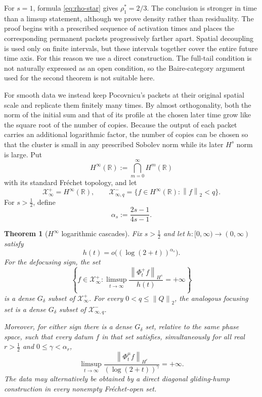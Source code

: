 \documentclass[10pt,a4paper]{amsart}
\numberwithin{equation}{section}
\newtheorem{theorem}{Theorem}[section]
\newcommand{\R}{\mathbb R}
\newcommand{\X}{\mathcal X}
\newcommand{\half}{\frac12}
\newcommand{\norm}[1]{\left\lVert #1\right\rVert}
\newcommand{\flow}[1]{\Phi^{#1}}
\begin{document}
For $s=1$, formula \eqref{eq:rho-star} gives $\rho_1^*=2/3$.  The conclusion is
stronger in time than a limsup statement, although we prove density rather
than residuality.  The proof begins with a prescribed sequence of activation
times and places the corresponding permanent packets progressively farther
apart.  Spatial decoupling is used only on finite intervals, but these
intervals together cover the entire future time axis.  For this reason we use
a direct construction.  The full-tail condition is not naturally expressed
as an open condition, so the Baire-category argument used for the second
theorem is not suitable here.

For smooth data we instead keep Pocovnicu's packets at their original spatial
scale and replicate them finitely many times.  By almost orthogonality, both
the norm of the initial sum and that of its profile at the chosen later time
grow like the square root of the number of copies.  Because the output of each
packet carries an additional logarithmic factor, the number of copies can be
chosen so that the cluster is small in any prescribed Sobolev norm while its
later $H^s$ norm is large.  Put
\begin{equation}\label{eq:hinfty}
 H^\infty(\R):=\bigcap_{m=0}^\infty H^m(\R)
\end{equation}
with its standard Fr\'echet topology, and let
\begin{equation}\label{eq:hinfty-spaces}
 \X^+_\infty=H^\infty(\R),
 \qquad
 \X^-_{\infty,q}=\{f\in H^\infty(\R):\norm f_2<q\}.
\end{equation}
For $s>\half$, define
\begin{equation}\label{eq:alpha}
 \alpha_s:=\frac{2s-1}{4s-1}.
\end{equation}

\begin{theorem}[$H^\infty$ logarithmic cascades]\label{thm:hinfty}
Fix $s>\half$ and let
$h:[0,\infty)\to(0,\infty)$ satisfy
\begin{equation}\label{eq:gauge}
 h(t)=o\bigl((\log(2+t))^{\alpha_s}\bigr).
\end{equation}
For the defocusing sign, the set
\begin{equation}\label{eq:hinfty-fixed}
 \left\{f\in\X^+_\infty:
 \limsup_{t\to\infty}
 \frac{\norm{\flow+_tf}_{H^s}}{h(t)}=+\infty\right\}
\end{equation}
is a dense $G_\delta$ subset of $\X^+_\infty$.  For every
$0<q\leq\norm Q_2$, the analogous focusing set is a dense $G_\delta$ subset
of $\X^-_{\infty,q}$.

Moreover, for either sign there is a dense $G_\delta$ set, relative to the
same phase space, such that every datum $f$ in that set satisfies,
simultaneously for all real $r>\half$ and $0\leq\gamma<\alpha_r$,
\begin{equation}\label{eq:simultaneous}
 \limsup_{t\to\infty}
 \frac{\norm{\flow\mu_tf}_{H^r}}
 { (\log(2+t))^\gamma}=+\infty.
\end{equation}
The data may alternatively be obtained by a direct diagonal gliding-hump
construction in every nonempty Fr\'echet-open set.
\end{theorem}
\end{document}
